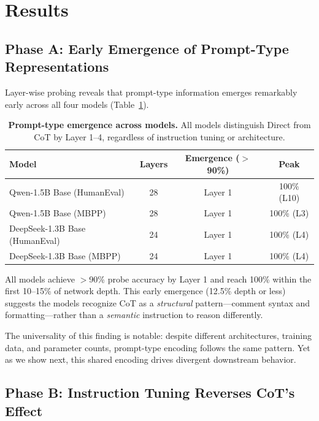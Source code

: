 \documentclass{article}
\begin{document}
\section{Results}

\subsection{Phase A: Early Emergence of Prompt-Type Representations}

Layer-wise probing reveals that prompt-type information emerges remarkably early across all four models (Table~\ref{tab:tomography}).

\begin{table}[h]
    \centering
    \caption{\textbf{Prompt-type emergence across models.} All models distinguish Direct from CoT by Layer 1--4, regardless of instruction tuning or architecture.}
    \label{tab:tomography}
    \begin{tabular}{lccc}
        \toprule
        \textbf{Model} & \textbf{Layers} & \textbf{Emergence ($>$90\%)} & \textbf{Peak} \\
        \midrule
        Qwen-1.5B Base (HumanEval) & 28 & Layer 1 & 100\% (L10) \\
        Qwen-1.5B Base (MBPP) & 28 & Layer 1 & 100\% (L3) \\
        DeepSeek-1.3B Base (HumanEval) & 24 & Layer 1 & 100\% (L4) \\
        DeepSeek-1.3B Base (MBPP) & 24 & Layer 1 & 100\% (L4) \\
        \bottomrule
    \end{tabular}
\end{table}

All models achieve $>$90\% probe accuracy by Layer 1 and reach 100\% within the first 10--15\% of network depth. This early emergence (12.5\% depth or less) suggests the models recognize CoT as a \emph{structural} pattern---comment syntax and formatting---rather than a \emph{semantic} instruction to reason differently.

The universality of this finding is notable: despite different architectures, training data, and parameter counts, prompt-type encoding follows the same pattern. Yet as we show next, this shared encoding drives divergent downstream behavior.

\subsection{Phase B: Instruction Tuning Reverses CoT's Effect}
\end{document}

